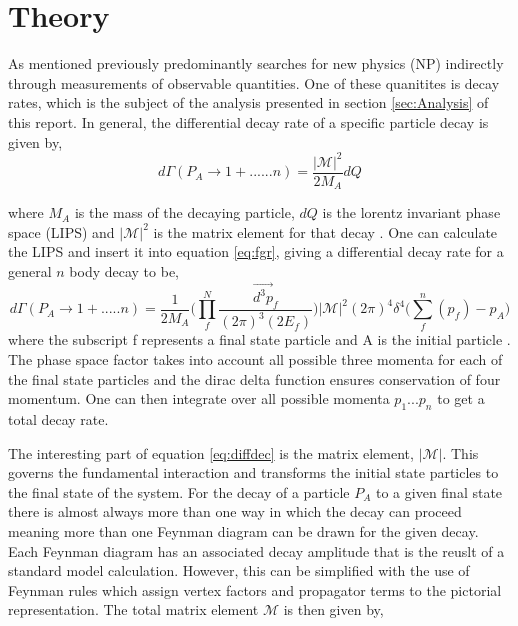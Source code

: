 
\section{Theory}
\label{sec:Theory}


As mentioned previously \lhcb predominantly searches for new physics (NP) indirectly through measurements of observable quantities.  One of these quanitites is decay rates, which is the subject of the analysis presented in section \ref{sec:Analysis} of this report.  In general, the differential decay rate of a specific particle decay is given by,
\begin{equation}
  \label{eq:fgr}
  d\Gamma(P_A\to1 + ......n) = \frac{|\mathscr{M}|^2}{2M_A}dQ
\end{equation}

where $M_A$ is the mass of the decaying particle, $dQ$ is the lorentz invariant phase space (LIPS) and $|\mathscr{M}|^2$ is the matrix element for that decay \cite{halzen1984quarks}.  One can calculate the LIPS and insert it into equation \ref{eq:fgr}, giving a differential decay rate for a general $n$ body decay to be,
\begin{equation}
  \label{eq:diffdec}
  d\Gamma(P_A \to 1+ .....n) = \frac{1}{2M_A}\bigg(\prod_{f}^{N}\frac{\vec{d^3p}_f}{(2\pi)^3(2E_f)}\bigg)|\mathscr{M}|^2(2\pi)^4\delta^4\bigg(\sum_{f}^n(p_f)-p_A\bigg)
\end{equation}
where the subscript f represents a final state particle and A is the initial particle \cite{halzen1984quarks}. The phase space factor takes into account all possible three momenta for each of the final state particles and the dirac delta function ensures conservation of four momentum.  One can then integrate over all possible momenta $p_1...p_n$ to get a total decay rate.

The interesting part of equation {\ref{eq:diffdec}} is the matrix element, $|\mathscr{M}|$.  This governs the fundamental interaction and transforms the initial state particles to the final state of the system.  For the decay of a particle $P_A$ to a given final state there is almost always more than one way in which the decay can proceed meaning more than one Feynman diagram can be drawn for the given decay.  Each Feynman diagram has an associated decay amplitude that is the reuslt of a standard model calculation.  However, this can be simplified with the use of Feynman rules which assign vertex factors and propagator terms to the pictorial representation.  The total matrix element $\mathscr{M}$ is then given by,

